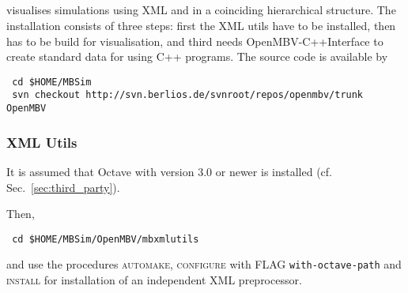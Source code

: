 \subsection{\OpenMBV{}}
\OpenMBV{} visualises \MBSim{} simulations using XML and \HDF{} in a coinciding hierarchical structure. The installation consists of three steps: first the XML utils have to be installed, then \OpenMBV{} has to be build for visualisation, and third \MBSim{} needs \textsf{OpenMBV-C++Interface} to create standard data for \OpenMBV{} using C++ programs. The source code is available by
\begin{verbatim}
 cd $HOME/MBSim
 svn checkout http://svn.berlios.de/svnroot/repos/openmbv/trunk OpenMBV
\end{verbatim}

\subsubsection{XML Utils}
It is assumed that Octave with version 3.0 or newer is installed (cf. Sec.~\ref{sec:third_party}).\par
Then,
\begin{verbatim}
 cd $HOME/MBSim/OpenMBV/mbxmlutils
\end{verbatim} 
and use the procedures \textsc{automake}, \textsc{configure} with FLAG \texttt{\-\-with-octave-path} and \textsc{install} for installation of an independent XML preprocessor. 

